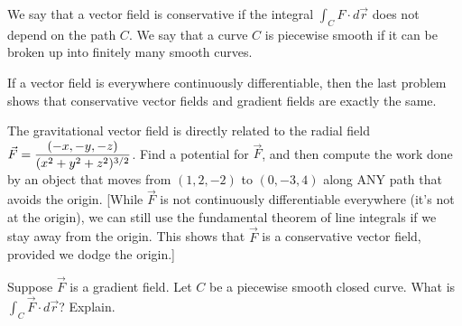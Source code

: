 \begin{definition}
 We say that a vector field is conservative if the integral $\int_C F\cdot d\vec r$ does not depend on the path $C$. We say that a curve $C$ is piecewise smooth if it can be broken up into finitely many smooth curves.
\end{definition}
 If a vector field is everywhere continuously differentiable, then the last problem shows that conservative vector fields and gradient fields are exactly the same.

\begin{problem}
 The gravitational vector field is directly related to the radial field $\displaystyle\vec F = \frac{\left(-x,-y,-z\right)}{(x^2+y^2+z^2)^{3/2}}$. Find a potential for $\vec F$, and then compute the work done by an object that moves from $(1,2,-2)$ to $(0,-3,4)$ along ANY path that avoids the origin. [While $\vec F$ is not continuously differentiable everywhere (it's not at the origin), we can still use the fundamental theorem of line integrals if we stay away from the origin. This shows that $\vec F$ is a conservative vector field, provided we dodge the origin.]
\end{problem}

\begin{problem}
 Suppose $\vec F$ is a gradient field.  Let $C$ be a piecewise smooth closed curve. What is $\int_C \vec F\cdot d\vec r$? Explain.
\end{problem}



